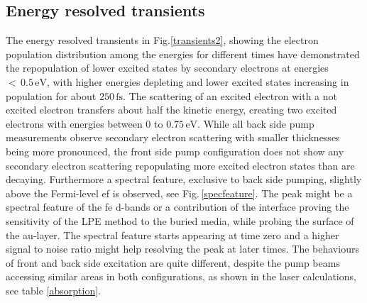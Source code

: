 \documentclass[a4paper,12pt,twoside]{article}
\begin{document}
        \subsection{Energy resolved transients}
            \label{ChapDED}
The energy resolved transients in Fig.\ref{transients2}, showing the electron population distribution among the energies for different times have demonstrated the repopulation of lower excited states by secondary electrons at energies $<\,0.5\,\mathrm{eV}$, with higher energies depleting and lower excited states increasing in population for about $250\,\mathrm{fs}$. The scattering of an excited electron with a not excited electron transfers about half the kinetic energy, creating two excited electrons with energies between $0$ to $0.75\,\mathrm{eV}$. While all back side pump measurements observe secondary electron scattering with smaller thicknesses being more pronounced, the front side pump configuration does not show any secondary electron scattering repopulating more excited electron states than are decaying. Furthermore a spectral feature, exclusive to back side pumping, slightly above the Fermi-level \gls{ef} is observed, see Fig.\,\ref{specfeature}. The peak might be a spectral feature of the \gls{fe} d-bands or a contribution of the interface proving the sensitivity of the \gls{LPE} method to the buried media, while probing the surface of the \gls{au}-layer. The spectral feature starts appearing at time zero and a higher signal to noise ratio might help resolving the peak at later times. The behaviours of front and back side excitation are quite different, despite the pump beams accessing similar areas in both configurations, as shown in the laser calculations, see table \ref{absorption}.
\\
\end{document}
